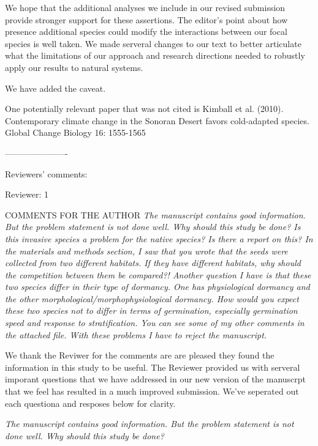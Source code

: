\documentclass[11pt]{article}
\begin{document}
We hope that the additional analyses we include in our revised submission provide stronger support for these assertions. The editor's point about how presence additional species could modify the interactions between our focal species is well taken. We made serveral changes to our text to better articulate what the limitations of our approach and research directions needed to robustly apply our results to natural systems.

We have added the caveat.


One potentially relevant paper that was not cited is Kimball et al. (2010). Contemporary climate change in the Sonoran Desert favors cold-adapted species. Global Change Biology 16: 1555-1565

----------------------

Reviewers’ comments:

Reviewer: 1

COMMENTS FOR THE AUTHOR
\emph{The manuscript contains good information. But the problem statement is not done well. Why should this study be done? Is this invasive species a problem for the native species? Is there a report on this? In the materials and methods section, I saw that you wrote that the seeds were collected from two different habitats. If they have different habitats, why should the competition between them be compared?! Another question I have is that these two species differ in their type of dormancy. One has physiological dormancy and the other morphological/morphophysiological dormancy. How would you expect these two species not to differ in terms of germination, especially germination speed and response to stratification. You can see some of my other comments in the attached file. With these problems I have to reject the manuscript.}

We thank the Reviwer for the comments are are pleased they found the information in this study to be useful. The Reviewer provided us with serveral imporant questions that we have addressed in our new version of the manuscrpt that we feel has resulted in a much improved submission. We've seperated out each questiona and resposes below for clarity.

\emph{The manuscript contains good information. But the problem statement is not done well. Why should this study be done?} 
\end{document}
